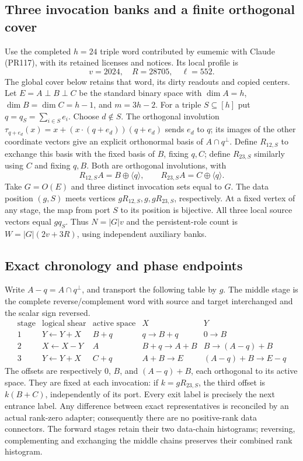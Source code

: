 \subsection{Three invocation banks and a finite orthogonal cover}
Use the completed $h=24$ triple word contributed by eumemic with Claude
(PR117), with its retained licenses and notices. Its local profile is
\[
 v=2024,\quad R=28705,\quad \ell=552.
\]
The global cover below retains that word, its dirty readouts and copied
centers. Let $E=A\perp B\perp C$ be the standard binary space with
$\dim A=h$, $\dim B=\dim C=h-1$, and $m=3h-2$.
For a triple $S\subseteq[h]$ put $q=q_S=\sum_{i\in S}e_i$.
Choose $d\notin S$. The orthogonal involution
$\tau_{q+e_d}(x)=x+(x\cdot(q+e_d))(q+e_d)$ sends $e_d$ to $q$;
its images of the other coordinate vectors give an explicit orthonormal
basis of $A\cap q^\perp$.
Define $R_{12,S}$ to exchange this basis with the fixed basis of $B$,
fixing $q,C$; define $R_{23,S}$ similarly using $C$ and fixing $q,B$.
Both are orthogonal involutions, with
\[
 R_{12,S}A=B\oplus\langle q\rangle,\qquad
 R_{23,S}A=C\oplus\langle q\rangle.
\]
Take $G=O(E)$ and three distinct invocation sets equal to $G$.
The data position $(g,S)$ meets vertices $gR_{12,S},g,gR_{23,S}$,
respectively. At a fixed vertex of any stage, the map from port $S$ to its
position is bijective. All three local source vectors equal $gq_S$.
Thus $N=|G|v$ and the persistent-role count is
$W=|G|(2v+3R)$, using independent auxiliary banks.

\subsection{Exact chronology and phase endpoints}
Write $A-q=A\cap q^\perp$, and transport the following table by $g$.
The middle stage is the complete reverse/complement word with source and
target interchanged and the scalar sign reversed.
\[
\begin{array}{c|c|c|c|c}
\text{stage}&\text{logical shear}&\text{active space}&X&Y\\\hline
1&Y\gets Y+X&B+q&q\longrightarrow B+q&0\longrightarrow B\\
2&X\gets X-Y&A&B+q\longrightarrow A+B&B\longrightarrow(A-q)+B\\
3&Y\gets Y+X&C+q&A+B\longrightarrow E&(A-q)+B\longrightarrow E-q
\end{array}
\]
The offsets are respectively $0$, $B$, and $(A-q)+B$, each orthogonal
to its active space. They are fixed at each invocation: if
$k=gR_{23,S}$, the third offset is $k(B+C)$, independently of its port.
Every exit label is precisely the next entrance label. Any difference
between exact representatives is reconciled by an actual rank-zero
adapter; consequently there are no positive-rank data connectors.
The forward stages retain their two data-chain histograms; reversing,
complementing and exchanging the middle chains preserves their combined
rank histogram.

